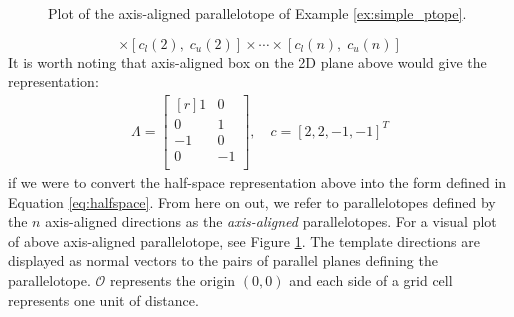 \begin{example}
\begin{figure}[t!]
  \centering

  \caption{Plot of the axis-aligned parallelotope of Example \ref{ex:simple_ptope}.}
  \label{fig:axis_align_ptope}
\end{figure}

\begin{equation}
[c_l(1), \;c_u(1)] \times [c_l(2),\; c_u(2)] \times \cdots \times [c_l(n), \; c_u(n)]
\end{equation}
%
It is worth noting that axis-aligned box on the 2D plane above would give the representation:
\begin{align}
  \Lambda = \begin{bmatrix*}[r]
            1 & 0 \\
            0 & 1 \\
            -1 & 0 \\
            0 & -1 \\
            \end{bmatrix*} , \quad c = [2,2,-1,-1]^T
\end{align}
if we were to convert the half-space representation above into the form defined in Equation \ref{eq:halfspace}.
%
From here on out, we refer to parallelotopes defined by the $n$ axis-aligned directions as the \emph{axis-aligned} parallelotopes.
%
For a visual plot of above axis-aligned parallelotope, see Figure \ref{fig:axis_align_ptope}. The template directions are displayed as normal vectors to the pairs of parallel planes defining the parallelotope. $\mathcal{O}$ represents the origin $(0,0)$ and each side of a grid cell represents one unit of distance.



\end{example}

